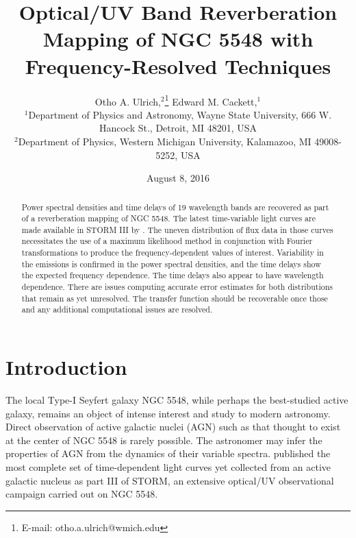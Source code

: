 \documentclass[11pt,letterpaper,fleqn]{article}
\begin{document}
\title{Optical/UV Band
Reverberation Mapping of NGC 5548 with Frequency-Resolved Techniques}

\author[Ulrich et al.]{
Otho A. Ulrich,$^{2}$\thanks{E-mail: otho.a.ulrich@wmich.edu}
Edward M. Cackett,$^{1}$
\\
$^{1}$Department of Physics and Astronomy, Wayne State University, 666 W.
Hancock St., Detroit, MI 48201, USA\\
$^{2}$Department of Physics, Western Michigan University, Kalamazoo, MI
49008-5252, USA\\
}
\date{August 8, 2016}

\maketitle

\begin{abstract}

Power spectral densities and time delays of 19 wavelength bands are recovered
as part of a reverberation mapping of NGC 5548. The latest time-variable light
curves are made available in STORM III by \citet{2016ApJ...821...56F}. The
uneven distribution of flux data in those curves necessitates the use of a
maximum likelihood method in conjunction with Fourier transformations to
produce the frequency-dependent values of interest. Variability in the
emissions is confirmed in the power spectral densities, and the time delays
show the expected frequency dependence. The time delays also appear to have
wavelength dependence. There are issues computing accurate error estimates for
both distributions that remain as yet unresolved. The transfer function should
be recoverable once those and any additional computational issues are
resolved.

\end{abstract}

\section{Introduction}

The local Type-I Seyfert galaxy NGC 5548, while perhaps the best-studied
active galaxy, remains an object of intense interest and study to modern
astronomy. Direct observation of active galactic nuclei (AGN) such as that
thought to exist at the center of NGC 5548 is rarely possible. The astronomer
may infer the properties of AGN from the dynamics of their variable spectra.
\citet{2016ApJ...821...56F} published the most complete set of time-dependent
light curves yet collected from an active galactic nucleus as part III of
STORM, an extensive optical/UV observational campaign carried out on NGC 5548. 
\end{document}
